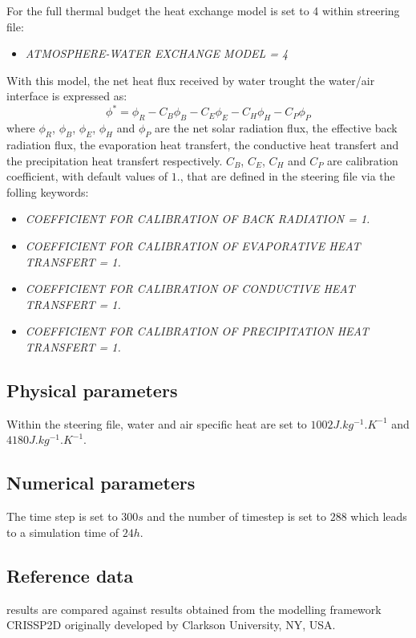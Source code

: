 For the full thermal budget the heat exchange model is set to 4 within \khione streering file:
\begin{itemize}
    \item\textit{ATMOSPHERE-WATER EXCHANGE MODEL = 4}
\end{itemize}
With this model, the net heat flux received by water trought the water/air interface is expressed as:
\begin{equation}
\phi^* = \phi_R - C_B\phi_B - C_E\phi_E - C_H\phi_H - C_P\phi_P
\end{equation}
where $\phi_R$, $\phi_B$, $\phi_E$, $\phi_H$ and $\phi_P$ are the net solar radiation flux, the effective back 
radiation flux, the evaporation heat transfert, the conductive heat transfert and the precipitation heat 
transfert respectively. $C_B$, $C_E$, $C_H$ and $C_P$ are calibration coefficient, with default values of $1.$, 
that are defined in the \khione steering file via the folling keywords:
\begin{itemize}
    \item\textit{COEFFICIENT FOR CALIBRATION OF BACK RADIATION = 1.}
    \item\textit{COEFFICIENT FOR CALIBRATION OF EVAPORATIVE HEAT TRANSFERT = 1.}
    \item\textit{COEFFICIENT FOR CALIBRATION OF CONDUCTIVE HEAT TRANSFERT = 1.}
    \item\textit{COEFFICIENT FOR CALIBRATION OF PRECIPITATION HEAT TRANSFERT = 1.}
\end{itemize}

\subsection{Physical parameters}
Within the \waqtel steering file, water and air specific heat are set to $1002J.kg^{-1}.K^{-1}$ and $4180 J.kg^{-1}.K^{-1}$.

\subsection{Numerical parameters}
The time step is set to $300s$ and the number of timestep is set to $288$ which leads to a simulation time of $24h$.

\subsection{Reference data}
\khione results are compared against results obtained from the modelling framework CRISSP2D originally developed by Clarkson University, NY, USA.

